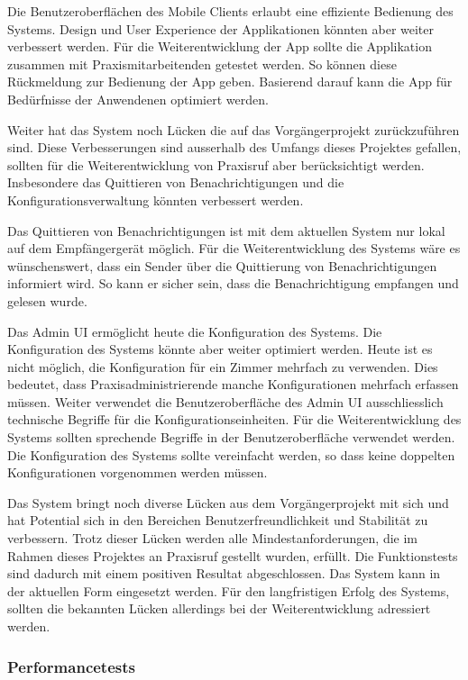Die Benutzeroberflächen des Mobile Clients erlaubt eine effiziente Bedienung des Systems.
Design und User Experience der Applikationen könnten aber weiter verbessert werden.
Für die Weiterentwicklung der App sollte die Applikation zusammen mit Praxismitarbeitenden getestet werden.
So können diese Rückmeldung zur Bedienung der App geben.
Basierend darauf kann die App für Bedürfnisse der Anwendenen optimiert werden.

Weiter hat das System noch Lücken die auf das Vorgängerprojekt zurückzuführen sind.
Diese Verbesserungen sind ausserhalb des Umfangs dieses Projektes gefallen, sollten für die Weiterentwicklung von Praxisruf aber berücksichtigt werden.
Insbesondere das Quittieren von Benachrichtigungen und die Konfigurationsverwaltung könnten verbessert werden.

Das Quittieren von Benachrichtigungen ist mit dem aktuellen System nur lokal auf dem Empfängergerät möglich.
Für die Weiterentwicklung des Systems wäre es wünschenswert, dass ein Sender über die Quittierung von Benachrichtigungen informiert wird.
So kann er sicher sein, dass die Benachrichtigung empfangen und gelesen wurde.

Das Admin UI ermöglicht heute die Konfiguration des Systems.
Die Konfiguration des Systems könnte aber weiter optimiert werden.
Heute ist es nicht möglich, die Konfiguration für ein Zimmer mehrfach zu verwenden.
Dies bedeutet, dass Praxisadministrierende manche Konfigurationen mehrfach erfassen müssen.
Weiter verwendet die Benutzeroberfläche des Admin UI ausschliesslich technische Begriffe für die Konfigurationseinheiten.
Für die Weiterentwicklung des Systems sollten sprechende Begriffe in der Benutzeroberfläche verwendet werden.
Die Konfiguration des Systems sollte vereinfacht werden, so dass keine doppelten Konfigurationen vorgenommen werden müssen.

Das System bringt noch diverse Lücken aus dem Vorgängerprojekt mit sich und hat Potential sich in den Bereichen Benutzerfreundlichkeit und Stabilität zu verbessern.
Trotz dieser Lücken werden alle Mindestanforderungen, die im Rahmen dieses Projektes an Praxisruf gestellt wurden, erfüllt.
Die Funktionstests sind dadurch mit einem positiven Resultat abgeschlossen.
Das System kann in der aktuellen Form eingesetzt werden.
Für den langfristigen Erfolg des Systems, sollten die bekannten Lücken allerdings bei der Weiterentwicklung adressiert werden.

\subsubsection{Performancetests}

